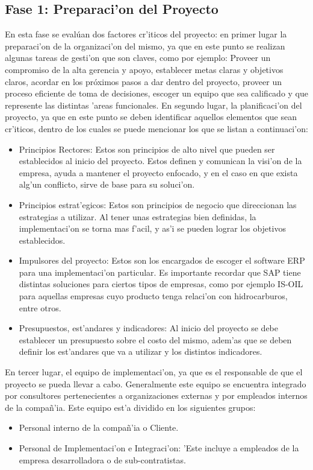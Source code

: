 \subsection{Fase 1: Preparaci'on del Proyecto}
En esta fase se evalúan dos factores cr'iticos del proyecto: en primer lugar la preparaci'on de la organizaci'on del mismo, ya que en este punto se realizan algunas tareas de gesti'on que son claves, como por ejemplo: Proveer un compromiso de la alta gerencia y apoyo, establecer metas claras y objetivos claros, acordar en los próximos pasos a dar dentro del proyecto, proveer un proceso eficiente de toma de decisiones, escoger un equipo que sea calificado y que represente las distintas 'areas funcionales.
En segundo lugar, la planificaci'on del proyecto, ya que en este punto se deben identificar aquellos elementos que sean cr'iticos, dentro de los cuales se puede mencionar los que se listan a continuaci'on:
\begin{itemize}
\item Principios Rectores: Estos son principios de alto nivel que pueden ser establecidos al inicio del proyecto. Estos definen y comunican la visi'on de la empresa, ayuda a mantener el proyecto enfocado, y en el caso en que exista alg'un conflicto, sirve de base para su soluci'on. 
\item Principios estrat'egicos:  Estos son principios de negocio que direccionan las estrategias a utilizar. Al tener unas estrategias bien definidas, la implementaci'on se torna mas f'acil, y as'i se pueden lograr los objetivos establecidos.
\item Impulsores del proyecto: Estos son los encargados de escoger el software ERP para una implementaci'on particular. Es importante recordar que SAP tiene distintas soluciones para ciertos tipos de empresas, como por ejemplo IS-OIL para aquellas empresas cuyo producto tenga relaci'on con hidrocarburos, entre otros. 
\item Presupuestos, est'andares y indicadores: Al inicio del proyecto se debe establecer un presupuesto sobre el costo del mismo, adem'as que se deben definir los est'andares que va a utilizar y los distintos indicadores.
\end{itemize}
En tercer lugar, el equipo de implementaci'on, ya que es el responsable de que el proyecto se pueda llevar a cabo. Generalmente este equipo se encuentra integrado por consultores pertenecientes a organizaciones externas y por empleados internos de la compa\~n'ia. Este equipo est'a dividido en los siguientes grupos:
\begin{itemize}
\item Personal interno de la compa\~n'ia o Cliente.
\item Personal de Implementaci'on e Integraci'on: 'Este incluye a empleados de la empresa desarrolladora o de sub-contratistas.
\end{itemize}

